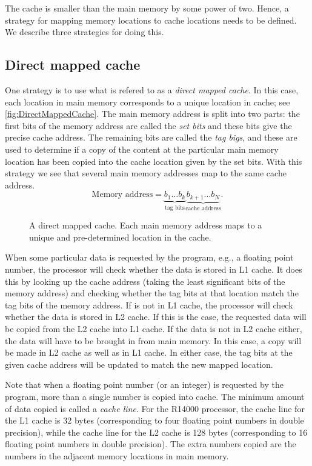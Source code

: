 The cache is smaller than the main memory by some power of two. Hence, a
strategy for mapping memory locations to cache locations needs to be defined. We
describe three strategies for doing this.

\subsection{Direct mapped cache}

One strategy is to use what is refered to as a \emph{direct mapped cache}. In
this case, each location in main memory corresponds to a unique location in
cache; see \autoref{fig:DirectMappedCache}. The main memory address is split
into two parts: the first bits of the memory address are called the \emph{set
bits} and these bits give the precise cache address. The remaining bits are
called the \emph{tag bigs}, and these are used to determine if a copy of the
content at the particular main memory location has been copied into the cache
location given by the set bits. With this strategy we see that several main
memory addresses map to the same cache address.
\[
  \text{Memory address} =
  \underbrace{b_1 \ldots b_k}_{\text{tag bits}}
  \underbrace{b_{k+1} \ldots b_{N}}_{\text{cache address}}.
\]

\begin{figure}
  \centering
  
  \caption{
    A direct mapped cache. Each main memory address maps to a unique and
    pre-determined location in the cache.
  }
  \label{fig:DirectMappedCache}
\end{figure}

When some particular data is requested by the program, e.g., a floating point
number, the processor will check whether the data is stored in L1 cache. It does
this by looking up the cache address (taking the least significant bits of the
memory address) and checking whether the tag bits at that location match the tag
bits of the memory address. If is not in L1 cache, the processor will check
whether the data is stored in L2 cache. If this is the case, the requested data
will be copied from the L2 cache into L1 cache. If the data is not in L2 cache
either, the data will have to be brought in from main memory. In this case, a
copy will be made in L2 cache as well as in L1 cache. In either case, the tag
bits at the given cache address will be updated to match the new mapped
location.

Note that when a floating point number (or an integer) is requested by the
program, more than a single number is copied into cache. The minimum amount of
data copied is called a {\em cache line}. For the R14000 processor, the cache
line for the L1 cache is 32 bytes (corresponding to four floating point numbers
in double precision), while the cache line for the L2 cache is 128 bytes
(corresponding to 16 floating point numbers in double precision). The extra
numbers copied are the numbers in the adjacent memory locations in main memory.

